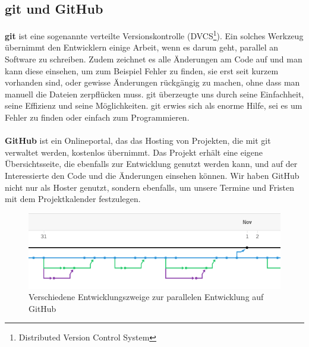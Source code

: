 \documentclass[12pt,a4paper]{scrartcl}
\begin{document}
\subsection{git und GitHub}
\textbf{git} ist eine sogenannte verteilte Versionskontrolle (DVCS\footnote{Distributed Version Control System}). Ein solches Werkzeug übernimmt
den Entwicklern einige Arbeit, wenn es darum geht, parallel an Software zu schreiben. Zudem zeichnet es alle Änderungen am Code auf und man kann diese
einsehen, um zum Beispiel Fehler zu finden, sie erst seit kurzem vorhanden sind, oder gewisse Änderungen rückgängig zu machen, ohne dass man
manuell die Dateien zerpflücken muss. git überzeugte uns durch seine Einfachheit, seine Effizienz und seine Möglichkeiten. git erwies sich
als enorme Hilfe, sei es um Fehler zu finden oder einfach zum Programmieren.
\\
\\
\textbf{GitHub} ist ein
Onlineportal, das das Hosting von Projekten, die mit git verwaltet werden, kostenlos übernimmt. Das Projekt erhält eine eigene Übersichtsseite,
die ebenfalls zur Entwicklung genutzt werden kann, und auf der Interessierte den Code und die Änderungen einsehen können. Wir haben GitHub nicht nur
als Hoster genutzt, sondern ebenfalls, um unsere Termine und Fristen mit dem Projektkalender festzulegen.
\begin{figure}
\centering
\includegraphics[scale=1]{img/branches.png}
\caption{Verschiedene Entwicklungszweige zur parallelen Entwicklung auf GitHub}
\label{fig:branches}
\end{figure}
\end{document}
